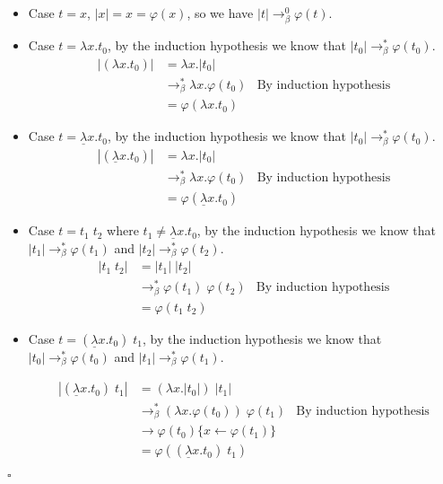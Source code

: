 \documentclass{article}
\theoremstyle{plain}
\renewcommand\qedsymbol{$\square$}
\newcommand{\rsbeta}{\to_\beta^*}
\newcommand{\mlambda}{{\underline \lambda}}
\begin{document}
  \begin{itemize}
    \item Case $t = x$, $|x| = x = \varphi(x)$, so we have $|t| \to_\beta^0
      \varphi(t)$.
    \item Case $t = \lambda x. t_0$, by the induction hypothesis we know that
      $|t_0| \rsbeta \varphi(t_0)$.
      \begin{align*}
        |(\lambda x. t_0)| &= \lambda x. |t_0| \\
        &\rsbeta \lambda x. \varphi(t_0) & \text{By induction hypothesis} \\
        &= \varphi(\lambda x. t_0)
      \end{align*}

    \item Case $t = \mlambda x. t_0$, by the induction hypothesis we know that
      $|t_0| \rsbeta \varphi(t_0)$.
      \begin{align*}
        |(\mlambda x. t_0)| &= \lambda x. |t_0| \\
        &\rsbeta \lambda x. \varphi(t_0) & \text{By induction hypothesis} \\
        &= \varphi(\mlambda x. t_0)
      \end{align*}

    \item Case $t = t_1\; t_2$ where $t_1 \not = \mlambda x. t_0$,
      by the induction hypothesis we know that
      $|t_1| \rsbeta \varphi(t_1)$ and $|t_2| \rsbeta \varphi(t_2)$.
      \begin{align*}
        |t_1\;t_2| &= |t_1|\;|t_2| \\
        &\rsbeta \varphi(t_1)\;\varphi(t_2) & \text{By induction hypothesis} \\
        &= \varphi(t_1\;t_2)
      \end{align*}

    \item Case $t=(\mlambda x. t_0)\;t_1$, by the induction hypothesis we know that
      $|t_0| \rsbeta \varphi(t_0)$ and $|t_1| \rsbeta \varphi(t_1)$.

        \begin{align*}
          |(\mlambda x. t_0)\;t_1| &= (\lambda x. |t_0|)\;|t_1| \\
            &\rsbeta (\lambda x. \varphi(t_0))\;\varphi(t_1) & \text{By
            induction hypothesis}\\
            &\to \varphi(t_0)\{x \leftarrow \varphi(t_1)\} \\
            &=\varphi((\mlambda x. t_0)\;t_1)
        \end{align*}

  \end{itemize}

  \qedsymbol
\end{document}
